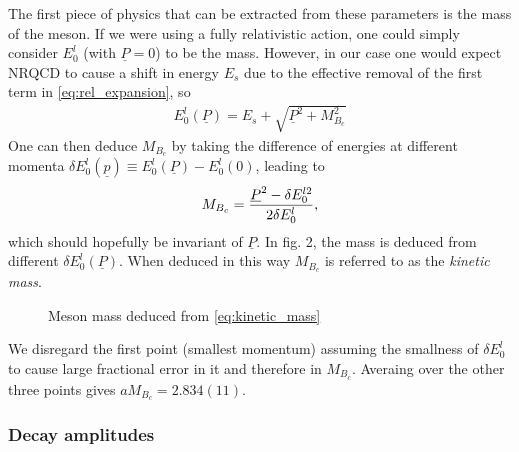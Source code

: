 The first piece of physics that can be extracted from these parameters is the mass of the meson. If we were using a fully relativistic action, one could simply consider $E^l_0$ (with $\underline{P}=0$) 
to be the mass. However, in our case one would expect NRQCD to cause a shift in energy $E_s$ due to the effective removal of the first term in \eqref{eq:rel_expansion}, so
\begin{align}
 E^l_0(\underline{P}) = E_s + \sqrt{ \underline{P}^2 + M_{B_c}^2 }
 \label{eq:euclidean_energy}
\end{align}
One can then deduce $M_{B_c}$ by taking the difference of energies at different momenta $\delta E^l_0(\underline{p}) \equiv E^l_0(\underline{P}) - E^l_0(0)$, leading to
\begin{align}
 M_{B_c} = { \underline{P}^2 - \delta E_0^{l2} \over 2\delta E^l_0 },
 \label{eq:kinetic_mass}
\end{align}
which should hopefully be invariant of $\underline{P}$. In fig. 2, the mass is deduced from different $\delta E^l_0(\underline{P})$. When deduced in this way $M_{B_c}$ is 
referred to as the \textit{kinetic mass}.
\begin{center}
\begin{figure}
\label{fig:k_mass}
\caption{Meson mass deduced from \eqref{eq:kinetic_mass}}
\end{figure}
\end{center}
We disregard the first point (smallest momentum) assuming the smallness of $\delta E^l_0$ to cause large fractional error in it and therefore in $M_{B_c}$. Averaing over the other three points gives
$aM_{B_c} = 2.834(11)$.

\subsubsection{Decay amplitudes}

